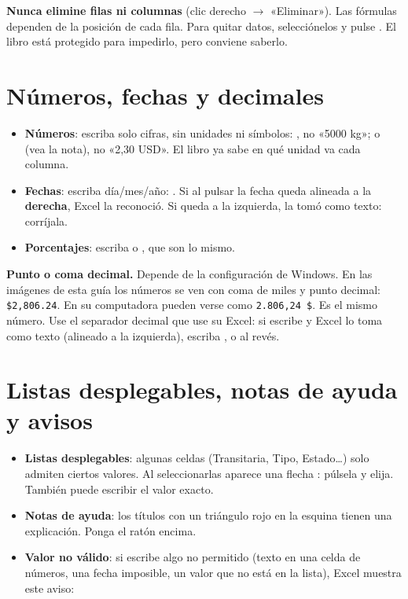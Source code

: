 \begin{atencion}
\textbf{Nunca elimine filas ni columnas} (clic derecho $\rightarrow$ «Eliminar»). Las fórmulas dependen de la posición de cada fila.
Para quitar datos, selecciónelos y pulse . El libro está protegido para impedirlo, pero conviene saberlo.
\end{atencion}

\section{Números, fechas y decimales}

\begin{itemize}
  \item \textbf{Números}: escriba solo cifras, sin unidades ni símbolos: , no «5000 kg»;  o 
        (vea la nota), no «2,30 USD». El libro ya sabe en qué unidad va cada columna.
  \item \textbf{Fechas}: escriba día/mes/año: . Si al pulsar  la fecha queda alineada a la
        \textbf{derecha}, Excel la reconoció. Si queda a la izquierda, la tomó como texto: corríjala.
  \item \textbf{Porcentajes}: escriba  o , que son lo mismo.
\end{itemize}

\begin{nota}
\textbf{Punto o coma decimal.} Depende de la configuración de Windows. En las imágenes de esta guía los números se ven
con coma de miles y punto decimal: \texttt{\$2,806.24}. En su computadora pueden verse como \texttt{2.806,24~\$}. Es el mismo número.
Use el separador decimal que use su Excel: si escribe  y Excel lo toma como texto (alineado a la izquierda),
escriba , o al revés.
\end{nota}

\section{Listas desplegables, notas de ayuda y avisos}

\begin{itemize}
  \item \textbf{Listas desplegables}: algunas celdas (Transitaria, Tipo, Estado\dots) solo admiten ciertos valores. Al seleccionarlas aparece
        una flecha : púlsela y elija. También puede escribir el valor exacto.
  \item \textbf{Notas de ayuda}: los títulos con un triángulo rojo en la esquina  tienen una explicación. Ponga el ratón encima.
  \item \textbf{Valor no válido}: si escribe algo no permitido (texto en una celda de números, una fecha imposible, un valor que no está
        en la lista), Excel muestra este aviso:
\end{itemize}

